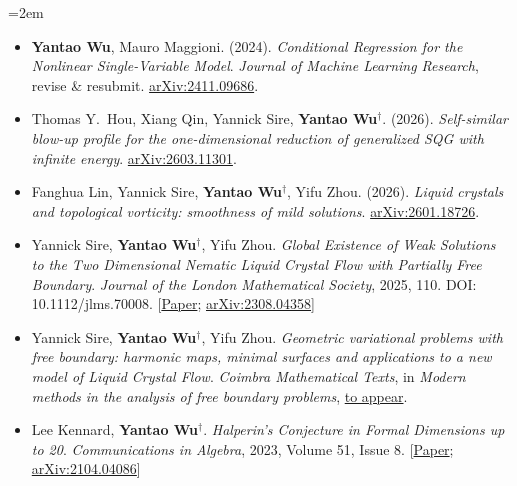 \documentclass[11pt]{ctexart}
\begin{document}
\begingroup
\footnotesize
{}
\emergencystretch=2em
\begin{itemize}
    \item \textbf{Yantao Wu}, Mauro Maggioni. (2024).
    \textit{Conditional Regression for the Nonlinear Single-Variable Model}.
    \textit{Journal of Machine Learning Research}, revise \& resubmit.
    \href{https://arxiv.org/abs/2411.09686}{arXiv:2411.09686}.

    \item Thomas Y.\ Hou, Xiang Qin, Yannick Sire, \textbf{Yantao Wu}$^\dagger$. (2026).
    \textit{Self-similar blow-up profile for the one-dimensional reduction of generalized SQG with infinite energy}.
    \href{https://arxiv.org/abs/2603.11301}{arXiv:2603.11301}.

    \item Fanghua Lin, Yannick Sire, \textbf{Yantao Wu}$^\dagger$, Yifu Zhou. (2026).
    \textit{Liquid crystals and topological vorticity: smoothness of mild solutions}.
    \href{https://arxiv.org/abs/2601.18726}{arXiv:2601.18726}.

    \item Yannick Sire, \textbf{Yantao Wu}$^\dagger$, Yifu Zhou.
    \textit{Global Existence of Weak Solutions to the Two Dimensional Nematic Liquid Crystal Flow with Partially Free Boundary}.
    \textit{Journal of the London Mathematical Society}, 2025, 110.
    DOI: 10.1112/jlms.70008.
    [\href{https://londmathsoc.onlinelibrary.wiley.com/doi/10.1112/jlms.70008}{Paper};
    \href{https://arxiv.org/abs/2308.04358}{arXiv:2308.04358}]

    \item Yannick Sire, \textbf{Yantao Wu}$^\dagger$, Yifu Zhou.
    \textit{Geometric variational problems with free boundary: harmonic maps, minimal surfaces and applications to a new model of Liquid Crystal Flow}.
    \textit{Coimbra Mathematical Texts}, in \textit{Modern methods in the analysis of free boundary problems},
    \href{https://www.mat.uc.pt/cmt/index.php/cmt}{to appear}.

    \item Lee Kennard, \textbf{Yantao Wu}$^\dagger$.
    \textit{Halperin's Conjecture in Formal Dimensions up to 20}.
    \textit{Communications in Algebra}, 2023, Volume 51, Issue 8.
    [\href{https://www.tandfonline.com/doi/abs/10.1080/00927872.2023.2186705}{Paper};
    \href{https://arxiv.org/abs/2104.04086}{arXiv:2104.04086}]
\end{itemize}
\endgroup
\end{document}
